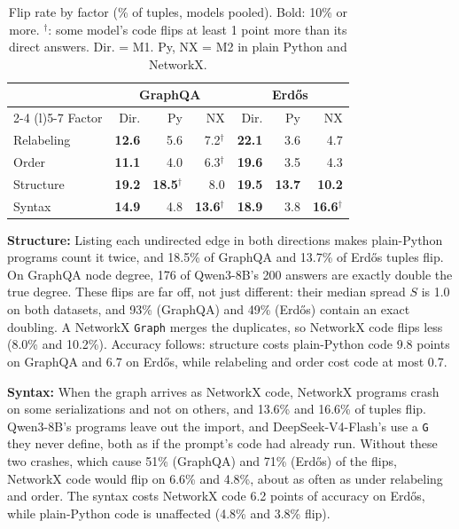 \documentclass[11pt]{article}
\begin{document}
\begin{table}[t]
\centering
\small\setlength{\tabcolsep}{3.2pt}
\begin{tabular}{@{}lrrrrrr@{}}
\toprule
 & \multicolumn{3}{c}{GraphQA} & \multicolumn{3}{c}{Erd\H{o}s} \\
\cmidrule(lr){2-4} \cmidrule(l){5-7}
Factor & Dir. & Py & NX & Dir. & Py & NX \\
\midrule
Relabeling & \textbf{12.6} & 5.6 & 7.2$^\dagger$ & \textbf{22.1} & 3.6 & 4.7 \\
Order & \textbf{11.1} & 4.0 & 6.3$^\dagger$ & \textbf{19.6} & 3.5 & 4.3 \\
Structure & \textbf{19.2} & \textbf{18.5}$^\dagger$ & 8.0 & \textbf{19.5} & \textbf{13.7} & \textbf{10.2} \\
Syntax & \textbf{14.9} & 4.8 & \textbf{13.6}$^\dagger$ & \textbf{18.9} & 3.8 & \textbf{16.6}$^\dagger$ \\
\bottomrule
\end{tabular}
\caption[Flip rate by factor]{ Flip rate by factor (\% of tuples, models pooled). Bold: 10\% or more. $^\dagger$: some model's code flips at least 1 point more than its direct answers. Dir. = M1. Py, NX = M2 in plain Python and NetworkX.}
\label{tab:2}
\end{table}

\textbf{Structure:} Listing each undirected edge in both directions makes plain-Python programs count it twice, and 18.5\% of GraphQA and 13.7\% of Erdős tuples flip. On GraphQA node degree, 176 of Qwen3-8B's 200 answers are exactly double the true degree. These flips are far off, not just different: their median spread $S$ is 1.0 on both datasets, and 93\% (GraphQA) and 49\% (Erdős) contain an exact doubling. A NetworkX \texttt{Graph} merges the duplicates, so NetworkX code flips less (8.0\% and 10.2\%). Accuracy follows: structure costs plain-Python code 9.8 points on GraphQA and 6.7 on Erdős, while relabeling and order cost code at most 0.7.

\textbf{Syntax:} When the graph arrives as NetworkX code, NetworkX programs crash on some serializations and not on others, and 13.6\% and 16.6\% of tuples flip. Qwen3-8B's programs leave out the import, and DeepSeek-V4-Flash's use a \texttt{G} they never define, both as if the prompt's code had already run. Without these two crashes, which cause 51\% (GraphQA) and 71\% (Erdős) of the flips, NetworkX code would flip on 6.6\% and 4.8\%, about as often as under relabeling and order. The syntax costs NetworkX code 6.2 points of accuracy on Erdős, while plain-Python code is unaffected (4.8\% and 3.8\% flip).
\end{document}
